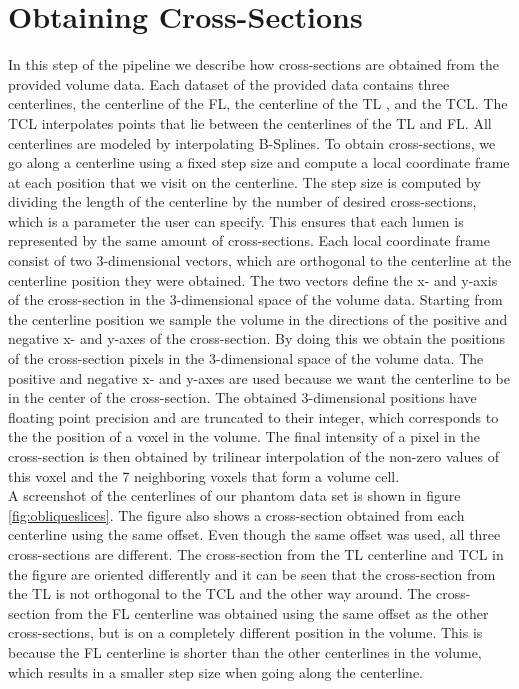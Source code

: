 \documentclass[thesis.tex]{subfiles}
\begin{document}
\section{Obtaining Cross-Sections}
In this step of the pipeline we describe how cross-sections are obtained from the provided volume data. Each dataset of the provided data contains three centerlines, the centerline of the FL, the centerline of the TL , and the TCL. The TCL interpolates points that lie between the centerlines of the TL and FL. All centerlines are modeled by interpolating B-Splines. To obtain cross-sections, we go along a centerline using a fixed step size and compute a local coordinate frame at each position that we visit on the centerline. The step size is computed by dividing the length of the centerline by the number of desired cross-sections, which is a parameter the user can specify. This ensures that each lumen is represented by the same amount of cross-sections. Each local coordinate frame consist of two 3-dimensional vectors, which are orthogonal to the centerline at the centerline position they were obtained. The two vectors define the x- and y-axis of the cross-section in the 3-dimensional space of the volume data. Starting from the centerline position we sample the volume in the directions of the positive and negative x- and y-axes of the cross-section. By doing this we obtain the positions of the cross-section pixels in the 3-dimensional space of the volume data. The positive and negative x- and y-axes are used because we want the centerline to be in the center of the cross-section. The obtained 3-dimensional positions have floating point precision and are truncated to their integer, which corresponds to the the position of a voxel in the volume. The final intensity of a pixel in the cross-section is then obtained by trilinear interpolation of the non-zero values of this voxel and the 7 neighboring voxels that form a volume cell. \\ A screenshot of the centerlines of our phantom data set is shown in figure \ref{fig:obliqueslices}. The figure also shows a cross-section obtained from each centerline using the same offset. Even though the same offset was used, all three cross-sections are different. The cross-section from the TL centerline and TCL in the figure are oriented differently and it can be seen that the cross-section from the TL is not orthogonal to the TCL and the other way around. The cross-section from the FL centerline was obtained using the same offset as the other cross-sections, but is on a completely different position in the volume. This is because the FL centerline is shorter than the other centerlines in the volume, which results in a smaller step size when going along the centerline. \\
\end{document}
